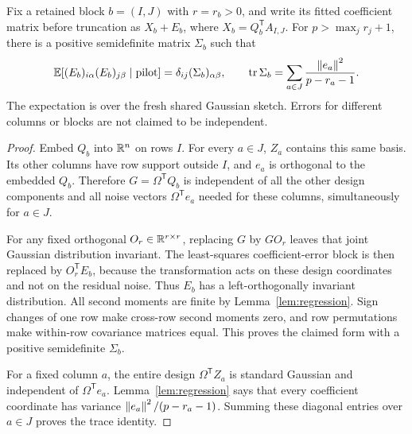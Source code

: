 \begin{lemma}\label{lem:sharedisotropy}
Fix a retained block $b=(I,J)$ with $r=r_b>0$, and write its fitted coefficient
matrix before truncation as $X_b+E_b$, where $X_b=Q_b^{\mathsf T}A_{I,J}$.
For $p>\max_jr_j+1$, there is a positive semidefinite matrix $\Sigma_b$ such
that
\[
 \mathbb E[(E_b)_{i\alpha}(E_b)_{j\beta}\mid\text{pilot}]
   =\delta_{ij}(\Sigma_b)_{\alpha\beta},
 \qquad
 \operatorname{tr}\Sigma_b=\sum_{a\in J}\frac{\left\lVert e_a\right\rVert^2}{p-r_a-1}.
\]
The expectation is over the fresh shared Gaussian sketch. Errors for
different columns or blocks are not claimed to be independent.
\end{lemma}
\begin{proof}
Embed $Q_b$ into $\mathbb R^n$ on rows $I$. For every $a\in J$, $Z_a$ contains
this same basis. Its other columns have row support outside $I$, and $e_a$
is orthogonal to the embedded $Q_b$.
Therefore $G=\Omega^{\mathsf T}Q_b$ is independent of all the other design
components and all noise vectors $\Omega^{\mathsf T}e_a$ needed for these
columns, simultaneously for $a\in J$.

For any fixed orthogonal $O_r\in\mathbb R^{r\times r}$, replacing $G$ by $GO_r$
leaves that joint Gaussian distribution invariant. The least-squares
coefficient-error block is then replaced by $O_r^{\mathsf T}E_b$, because
the transformation acts on these design coordinates and not on the residual
noise. Thus $E_b$ has a left-orthogonally invariant distribution.
All second moments are finite by Lemma~\ref{lem:regression}.
Sign changes of one row make cross-row second moments zero, and row
permutations make within-row covariance matrices equal. This proves the
claimed form with a positive semidefinite $\Sigma_b$.

For a fixed column $a$, the entire design
$\Omega^{\mathsf T}Z_a$ is standard Gaussian and independent of
$\Omega^{\mathsf T}e_a$. Lemma~\ref{lem:regression} says that every
coefficient coordinate has variance $\left\lVert e_a\right\rVert^2/(p-r_a-1)$.
Summing these diagonal entries over $a\in J$ proves the trace identity.
\end{proof}

